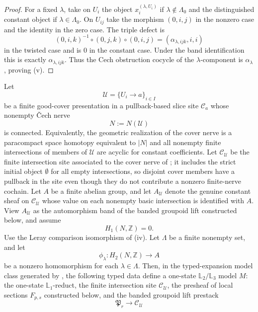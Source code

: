 \begin{proof}
For a fixed $\lambda$, take on $U_i$ the object $x_i^{(\lambda,U_i)}$ if $\lambda\notin\Lambda_0$ and the distinguished constant object if $\lambda\in\Lambda_0$. On $U_{ij}$ take the morphism $(0,i,j)$ in the nonzero case and the identity in the zero case. The triple defect is
\[
(0,i,k)^{-1}\circ(0,j,k)\circ(0,i,j)
=
(\alpha_{\lambda,ijk},i,i)
\]
in the twisted case and is $0$ in the constant case. Under the band identification this is exactly $\alpha_{\lambda,ijk}$. Thus the Cech obstruction cocycle of the $\lambda$-component is $\alpha_\lambda$, proving \textup{(v)}.
\end{proof}

\begin{theorem}\label{thm:prescribed-component-image-construction}
Let
\[
\mathcal U=\{U_i\to a\}_{i\in I}
\]
be a finite good-cover presentation in a pullback-based slice site $\mathcal C_a$ whose nonempty \v{C}ech nerve
\[
N:=N(\mathcal U)
\]
is connected. Equivalently, the geometric realization of the cover nerve is a
paracompact space homotopy equivalent to $|N|$ and all nonempty finite
intersections of members of $\mathcal U$ are acyclic for constant
coefficients. Let $\mathcal C_{\mathcal U}$ be the finite intersection site associated to the cover nerve of
; it includes the strict
initial object $\emptyset$ for all empty intersections, so disjoint cover
members have a pullback in the site even though they do not contribute a
nonzero finite-nerve cochain. Let $A$ be a finite abelian group, and let
$A_{\mathcal U}$ denote the genuine constant sheaf on
$\mathcal C_{\mathcal U}$ whose value on each nonempty basic intersection
is identified with $A$. View $A_{\mathcal U}$ as the automorphism band of
the banded groupoid lift constructed below, and assume
\[
H_1(N,\mathbb Z)=0.
\]
Use the Leray comparison isomorphism of
(iv). Let $\Lambda$ be a finite nonempty set, and let
\[
\phi_\lambda:H_2(N,\mathbb Z)\to A
\]
be a nonzero homomorphism for each $\lambda\in\Lambda$. Then, in the
typed-expansion model class generated by
, the following typed data
define a one-state $\mathbb L_2/\mathbb L_3$ model \(M\): the one-state
\(\mathbb L_1\)-reduct, the finite intersection site \(\mathcal C_{\mathcal U}\), the
presheaf of local sections \(F_{p,s}\) constructed below, and the banded groupoid lift
prestack
\[
\mathfrak P_r\to \mathcal C_{\mathcal U}
\]
\end{theorem}
